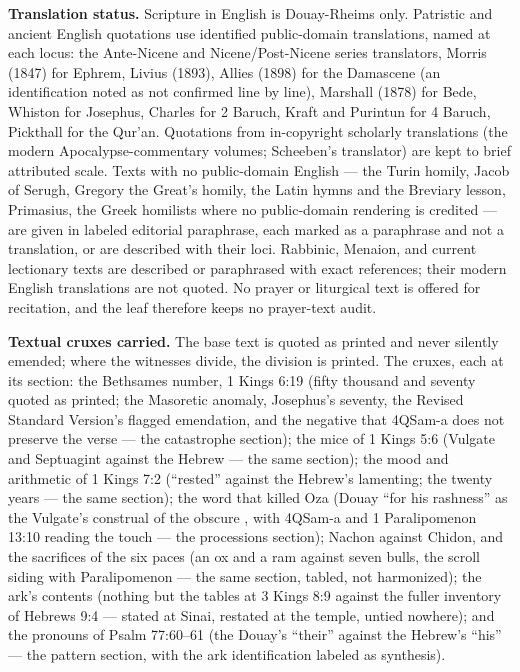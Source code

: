 \textbf{Translation status.} Scripture in English is Douay-Rheims only.
Patristic and ancient English quotations use identified public-domain
translations, named at each locus: the Ante-Nicene and
Nicene/Post-Nicene series translators, Morris (1847) for Ephrem, Livius
(1893), Allies (1898) for the Damascene (an identification noted as not
confirmed line by line), Marshall (1878) for Bede, Whiston for Josephus,
Charles for 2 Baruch, Kraft and Purintun for 4 Baruch, Pickthall for the
Qur'an. Quotations from in-copyright scholarly translations (the modern
Apocalypse-commentary volumes; Scheeben's translator) are kept to brief
attributed scale. Texts with no public-domain English --- the Turin
homily, Jacob of Serugh, Gregory the Great's homily, the Latin hymns and
the Breviary lesson, Primasius, the Greek homilists where no
public-domain rendering is credited --- are given in labeled editorial
paraphrase, each marked as a paraphrase and not a translation, or are
described with their loci. Rabbinic, Menaion, and current lectionary
texts are described or paraphrased with exact references; their modern
English translations are not quoted. No prayer or liturgical text is
offered for recitation, and the leaf therefore keeps no prayer-text
audit.

\textbf{Textual cruxes carried.} The base text is quoted as printed and
never silently emended; where the witnesses divide, the division is
printed. The cruxes, each at its section: the Bethsames number, 1 Kings
6:19 (fifty thousand and seventy quoted as printed; the Masoretic
anomaly, Josephus's seventy, the Revised Standard Version's flagged
emendation, and the negative that 4QSam-a does not preserve the verse
--- the catastrophe section); the mice of 1 Kings 5:6 (Vulgate and
Septuagint against the Hebrew --- the same section); the mood and
arithmetic of 1 Kings 7:2 (``rested'' against the Hebrew's lamenting;
the twenty years --- the same section); the word that killed Oza (Douay
``for his rashness'' as the Vulgate's construal of the obscure
, with 4QSam-a and 1 Paralipomenon 13:10 reading the touch
--- the processions section); Nachon against Chidon, and the sacrifices
of the six paces (an ox and a ram against seven bulls, the scroll
siding with Paralipomenon --- the same section, tabled, not
harmonized); the ark's contents (nothing but the tables at 3 Kings 8:9
against the fuller inventory of Hebrews 9:4 --- stated at Sinai,
restated at the temple, untied nowhere); and the pronouns of Psalm
77:60--61 (the Douay's ``their'' against the Hebrew's ``his'' --- the
pattern section, with the ark identification labeled as synthesis).

